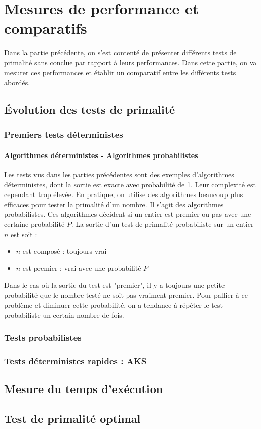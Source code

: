 \section{Mesures de performance et comparatifs}
	Dans la partie précédente, on s'est contenté de présenter différents tests de primalité sans conclue par rapport à leurs performances. Dans cette partie, on va mesurer ces performances et établir un comparatif entre les différents tests abordés.
	
	\subsection{Évolution des tests de primalité}
		\subsubsection*{Premiers tests déterministes}
		
			\paragraph{Algorithmes déterministes - Algorithmes probabilistes} Les tests vus dans les parties précédentes sont des exemples d'algorithmes déterministes, dont la sortie est exacte avec probabilité de 1. Leur complexité est cependant trop élevée. 
			En pratique, on utilise des algorithmes beaucoup plus efficaces pour tester la primalité d'un nombre. Il s'agit des algorithmes probabilistes. Ces algorithmes décident si un entier est premier ou pas avec une certaine probabilité $P$. La sortie d'un test de primalité probabiliste sur un entier $n$ est soit :
			\begin{itemize}
				\item $n$ est composé : toujours vrai
				\item $n$ est premier : vrai avec une probabilité $P$
			\end{itemize}
			Dans le cas où la sortie du test est "premier", il y a toujours une petite probabilité que le nombre testé ne soit pas vraiment premier. Pour pallier à ce problème et diminuer cette probabilité, on a tendance à répéter le test probabiliste un certain nombre de fois.
			
		\subsubsection*{Tests probabilistes}
		\subsubsection*{Tests déterministes rapides : AKS}
		
	
	\subsection{Mesure du temps d'exécution}
	
	\subsection{Test de primalité optimal}
		
